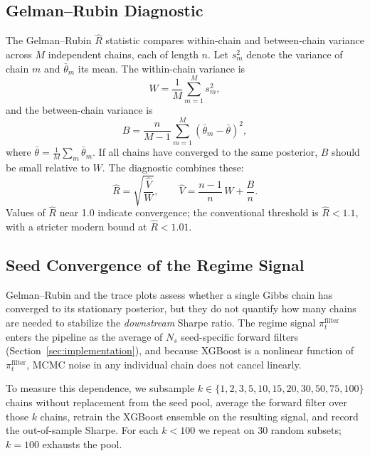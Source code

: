 \subsection{Gelman--Rubin Diagnostic}\label{app:gelman_rubin}

The Gelman--Rubin $\hat{R}$ statistic \citep{GelmanRubin1992, Gelman2013} compares within-chain and between-chain variance across $M$ independent chains, each of length $n$. Let $s_m^2$ denote the variance of chain $m$ and $\bar{\theta}_m$ its mean. The within-chain variance is
\begin{equation}
    W = \frac{1}{M} \sum_{m=1}^{M} s_m^2,
\end{equation}
and the between-chain variance is
\begin{equation}
    B = \frac{n}{M-1} \sum_{m=1}^{M} (\bar{\theta}_m - \bar{\theta})^2,
\end{equation}
where $\bar{\theta} = \frac{1}{M}\sum_m \bar{\theta}_m$. If all chains have converged to the same posterior, $B$ should be small relative to $W$. The diagnostic combines these:
\begin{equation}
    \hat{R} = \sqrt{\frac{\hat{V}}{W}}, \qquad \hat{V} = \frac{n-1}{n}\,W + \frac{B}{n}.
\end{equation}
Values of $\hat{R}$ near 1.0 indicate convergence; the conventional threshold is $\hat{R} < 1.1$, with a stricter modern bound at $\hat{R} < 1.01$.



\subsection{Seed Convergence of the Regime Signal}\label{app:seed_convergence}

Gelman--Rubin and the trace plots assess whether a single Gibbs chain has converged to its stationary posterior, but they do not quantify how many chains are needed to stabilize the \emph{downstream} Sharpe ratio. The regime signal $\pi_t^{\text{filter}}$ enters the pipeline as the average of $N_s$ seed-specific forward filters (Section~\ref{sec:implementation}), and because XGBoost is a nonlinear function of $\pi_t^{\text{filter}}$, MCMC noise in any individual chain does not cancel linearly.

To measure this dependence, we subsample $k \in \{1, 2, 3, 5, 10, 15, 20, 30, 50, 75, 100\}$ chains without replacement from the seed pool, average the forward filter over those $k$ chains, retrain the XGBoost ensemble on the resulting signal, and record the out-of-sample Sharpe. For each $k < 100$ we repeat on 30 random subsets; $k = 100$ exhausts the pool.

